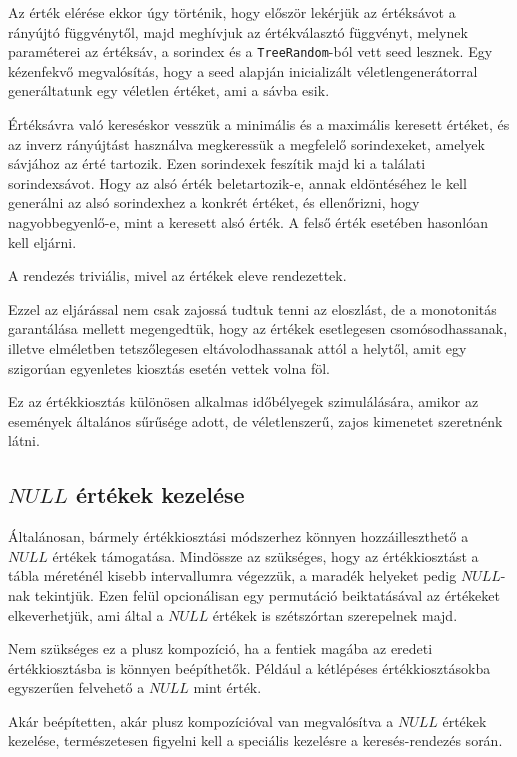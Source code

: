 \documentclass[
    parspace,
    noindent,
    nohyp,
]{elteiktdk}[2023/04/10]
\begin{document}
Az érték elérése ekkor úgy történik, hogy először lekérjük az értéksávot a rányújtó függvénytől,
majd meghívjuk az értékválasztó függvényt,
melynek paraméterei az értéksáv, a sorindex és a \texttt{TreeRandom}-ból vett seed lesznek.
Egy kézenfekvő megvalósítás,
hogy a seed alapján inicializált véletlengenerátorral
generáltatunk egy véletlen értéket, ami a sávba esik.

Értéksávra való kereséskor vesszük a minimális és a maximális keresett értéket,
és az inverz rányújtást használva megkeressük a megfelelő sorindexeket, amelyek sávjához az érté tartozik.
Ezen sorindexek feszítik majd ki a találati sorindexsávot.
Hogy az alsó érték beletartozik-e, annak eldöntéséhez le kell generálni
az alsó sorindexhez a konkrét értéket, és ellenőrizni, hogy nagyobbegyenlő-e,
mint a keresett alsó érték.
A felső érték esetében hasonlóan kell eljárni.

A rendezés triviális, mivel az értékek eleve rendezettek.

Ezzel az eljárással nem csak zajossá tudtuk tenni az eloszlást,
de a monotonitás garantálása mellett megengedtük,
hogy az értékek esetlegesen csomósodhassanak,
illetve elméletben tetszőlegesen eltávolodhassanak attól a helytől,
amit egy szigorúan egyenletes kiosztás esetén vettek volna föl.

Ez az értékkiosztás különösen alkalmas időbélyegek szimulálására,
amikor az események általános sűrűsége adott,
de véletlenszerű, zajos kimenetet szeretnénk látni.

\subsection{$NULL$ értékek kezelése}

Általánosan, bármely értékkiosztási módszerhez könnyen hozzáilleszthető a $NULL$ értékek támogatása.
Mindössze az szükséges, hogy az értékkiosztást a tábla méreténél kisebb intervallumra végezzük,
a maradék helyeket pedig $NULL$-nak tekintjük.
Ezen felül opcionálisan egy permutáció beiktatásával az értékeket elkeverhetjük,
ami által a $NULL$ értékek is szétszórtan szerepelnek majd.

Nem szükséges ez a plusz kompozíció,
ha a fentiek magába az eredeti értékkiosztásba is könnyen beépíthetők.
Például a kétlépéses értékkiosztásokba egyszerűen felvehető a $NULL$ mint érték.

Akár beépítetten, akár plusz kompozícióval van megvalósítva a $NULL$ értékek kezelése,
természetesen figyelni kell a speciális kezelésre a keresés-rendezés során.
\end{document}
